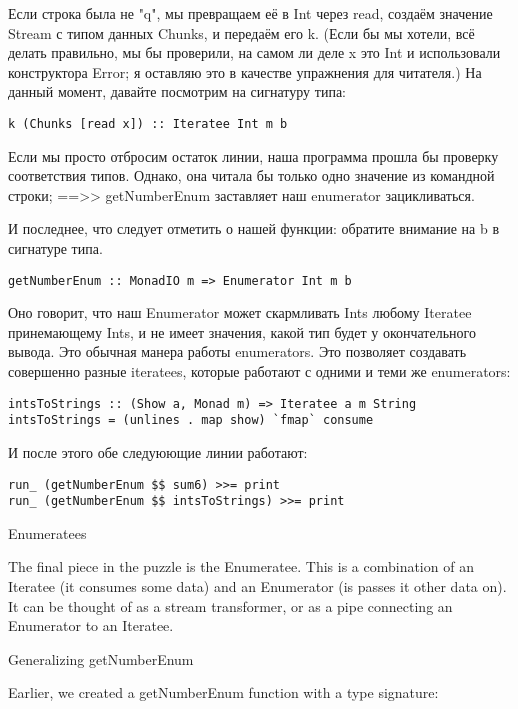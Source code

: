Если строка была не "q", мы превращаем её в Int через read, создаём значение Stream с типом данных Chunks, и передаём его k. (Если бы мы хотели, всё делать правильно, мы бы проверили, на самом ли деле x это Int и использовали конструктора Error; я оставляю это в качестве упражнения для читателя.) На данный момент, давайте посмотрим на сигнатуру типа:

\begin{lstlisting}
k (Chunks [read x]) :: Iteratee Int m b
\end{lstlisting}

Если мы просто отбросим остаток линии, наша программа прошла бы проверку соответствия типов. Однако, она читала бы только одно значение из командной строки; ==>> getNumberEnum заставляет наш enumerator зацикливаться.

И последнее, что следует отметить о нашей функции: обратите внимание на b в сигнатуре типа.

\begin{lstlisting}
getNumberEnum :: MonadIO m => Enumerator Int m b
\end{lstlisting}

Оно говорит, что наш Enumerator может скармливать Ints любому Iteratee принемающему Ints, и не имеет значения, какой тип будет у окончательного вывода. Это обычная манера работы enumerators. Это позволяет создавать совершенно разные iteratees, которые работают с одними и теми же enumerators:

\begin{lstlisting}
intsToStrings :: (Show a, Monad m) => Iteratee a m String
intsToStrings = (unlines . map show) `fmap` consume
\end{lstlisting}

И после этого обе следуюющие линии работают:

\begin{lstlisting}
run_ (getNumberEnum $$ sum6) >>= print
run_ (getNumberEnum $$ intsToStrings) >>= print
\end{lstlisting}

Enumeratees

The final piece in the puzzle is the Enumeratee. This is a combination of an Iteratee (it consumes some data) and an Enumerator (is passes it other data on). It can be thought of as a stream transformer, or as a pipe connecting an Enumerator to an Iteratee.

Generalizing getNumberEnum

Earlier, we created a getNumberEnum function with a type signature:

